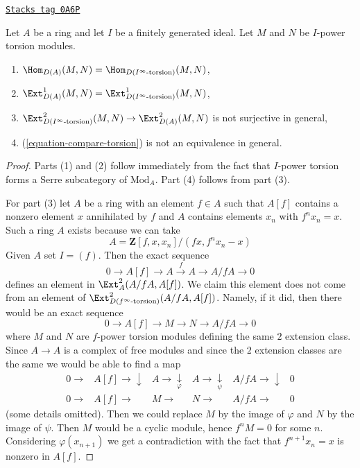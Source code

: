 \begin{lemma}
\label{dualizing-lemma-not-equal}
\href{https://stacks.math.columbia.edu/tag/0A6P}{\texttt{Stacks tag 0A6P}}

Let $A$ be a ring and let $I$ be a finitely generated ideal.
Let $M$ and $N$ be $I$-power torsion modules.
\begin{enumerate}
\item $\Hom_{D(A)}(M, N) = \Hom_{D({I^\infty\text{-torsion}})}(M, N)$,
\item $\Ext^1_{D(A)}(M, N) =
\Ext^1_{D({I^\infty\text{-torsion}})}(M, N)$,
\item $\Ext^2_{D({I^\infty\text{-torsion}})}(M, N) \to
\Ext^2_{D(A)}(M, N)$ is not surjective in general,
\item (\ref{equation-compare-torsion}) is not an equivalence in general.
\end{enumerate}
\end{lemma}

\begin{proof}
Parts (1) and (2) follow immediately from the fact that $I$-power torsion
forms a Serre subcategory of $\text{Mod}_A$. Part (4) follows from
part (3).

\medskip\noindent
For part (3) let $A$ be a ring with an element $f \in A$ such that
$A[f]$ contains a nonzero element $x$ annihilated by $f$ and
$A$ contains elements $x_n$ with $f^nx_n = x$. Such a ring $A$
exists because we can take
$$
A = \mathbf{Z}[f, x, x_n]/(fx, f^nx_n - x)
$$
Given $A$ set $I = (f)$. Then the exact sequence
$$
0 \to A[f] \to A \xrightarrow{f} A \to A/fA \to 0
$$
defines an element in $\Ext^2_A(A/fA, A[f])$. We claim this
element does not come from an element of
$\Ext^2_{D(f^\infty\text{-torsion})}(A/fA, A[f])$.
Namely, if it did, then there would be an exact sequence
$$
0 \to A[f] \to M \to N \to A/fA \to 0
$$
where $M$ and $N$ are $f$-power torsion modules defining the same
$2$ extension class. Since $A \to A$ is a complex of free modules
and since the $2$ extension classes are the same
we would be able to find a map
$$
\begin{array}{cccccc}0 \longrightarrow & A[f] \longrightarrow\downarrow & A \longrightarrow\underset{\varphi}{\downarrow} & A \longrightarrow\underset{\psi}{\downarrow} & A/fA \longrightarrow\downarrow & 0 \\ 0 \longrightarrow & A[f] \longrightarrow & M \longrightarrow & N \longrightarrow & A/fA \longrightarrow & 0\end{array}
$$
(some details omitted). Then we could replace $M$ by the image of
$\varphi$ and $N$ by the image of $\psi$. Then $M$ would be a cyclic
module, hence $f^n M = 0$ for some $n$. Considering $\varphi(x_{n + 1})$
we get a contradiction with the fact that $f^{n + 1}x_n = x$ is
nonzero in $A[f]$.
\end{proof}

